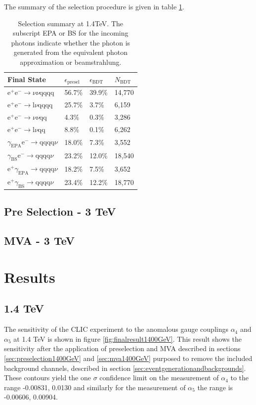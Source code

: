 The summary of the selection procedure is given in table \ref{table:selectionsummary1400GeV}.

\begin{table}[h!]
\centering
\begin{tabular}{ l l l l}
\hline
Final State & $\epsilon_{\text{presel}}$ & $\epsilon_{\text{BDT}}$ & $N_{\text{BDT}}$ \\ 
\hline
$\text{e}^{+}\text{e}^{-} \rightarrow \nu{\nu}\text{qqqq}$ & 56.7\% & 39.9\% & 14,770 \\
$\text{e}^{+}\text{e}^{-} \rightarrow \text{l}\nu\text{qqqq}$ & 25.7\% & 3.7\% & 6,159 \\
$\text{e}^{+}\text{e}^{-} \rightarrow \nu{\nu}\text{qq}$ & 4.3\% & 0.3\% & 3,286 \\
$\text{e}^{+}\text{e}^{-} \rightarrow \text{l}\nu\text{qq}$ & 8.8\% & 0.1\% & 6,262 \\
$\gamma_{\text{EPA}}\text{e}^{-} \rightarrow \text{qqqq}\nu$ & 18.0\% & 7.3\% & 3,552 \\
$\gamma_{\text{BS}}\text{e}^{-} \rightarrow \text{qqqq}\nu$ & 23.2\% & 12.0\% & 18,540 \\
$\text{e}^{+}\gamma_{\text{EPA}} \rightarrow \text{qqqq}\nu$ & 18.2\% & 7.5\% & 3,652 \\
$\text{e}^{+}\gamma_{\text{BS}} \rightarrow \text{qqqq}\nu$ & 23.4\% & 12.2\% & 18,770 \\
\hline
\end{tabular}
\caption[Selection summary at 1.4TeV.]{Selection summary at 1.4TeV.   The subscript EPA or BS for the incoming photons indicate whether the photon is generated from the equivalent photon approximation or beamstrahlung.}
\label{table:selectionsummary1400GeV}
\end{table}

\subsection{Pre Selection - 3 TeV}
\subsection{MVA - 3 TeV}

\section{Results}
\subsection{1.4 TeV}
The sensitivity of the CLIC experiment to the anomalous gauge couplings $\alpha_{4}$ and $\alpha_{5}$ at 1.4 TeV is shown in figure \ref{fig:finalresult1400GeV}.  This result shows the sensitivity after the application of preselection and MVA described in sections \ref{sec:preselection1400GeV} and \ref{sec:mva1400GeV} purposed to remove the included background channels, described in section \ref{sec:eventgenerationandbackgrounds}.  These contours yield the one $\sigma$ confidence limit on the measurement of $\alpha_{4}$ to the range -0.00831, 0.0130 and similarly for the measurement of $\alpha_{5}$ the range is -0.00606, 0.00904.


